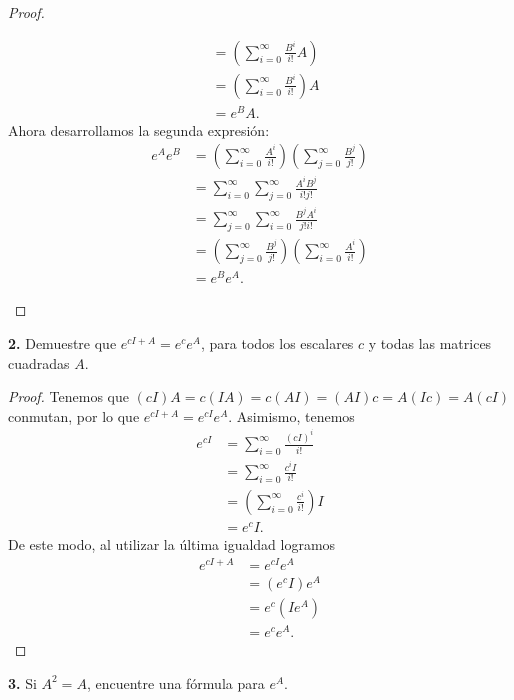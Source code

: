 \documentclass{article}
\newenvironment{statement}[1]{\smallskip\noindent\color[rgb]{1.00,0.00,0.50} {\bf #1.}}{}
\theoremstyle{definition}
\theoremstyle{remark}
\begin{document}
\begin{proof}
\begin{enumerate}
\begin{align*}
        &= \left(\sum_{i = 0}^{\infty} \frac{B^i}{i!} A\right)\\
        &= \left(\sum_{i = 0}^{\infty} \frac{B^i}{i!}\right) A\\
        &= e^B A.
      \end{align*}
      Ahora desarrollamos la segunda expresi\'on:
      \begin{align*}
        e^A e^B &= \left(\sum_{i = 0}^{\infty} \frac{A^i}{i!}\right)\left(\sum_{j = 0}^{\infty} \frac{B^j}{j!}\right)\\
        &= \sum_{i = 0}^{\infty} \sum_{j = 0}^{\infty} \frac{A^i B^j}{i! j!}\\
        &= \sum_{j = 0}^{\infty} \sum_{i = 0}^{\infty} \frac{B^j A^i}{j! i!}\\
        &= \left(\sum_{j = 0}^{\infty} \frac{B^j}{j!}\right)\left(\sum_{i = 0}^{\infty} \frac{A^i}{i!}\right)\\
        &= e^B e^A.
      \end{align*}
  \end{enumerate}
\end{proof}

\begin{statement}{2}
  Demuestre que $e^{c I  + A} = e^c e^A$, para todos los escalares $c$ y todas las matrices cuadradas $A$.
\end{statement}

\begin{proof}
  Tenemos que $(c I) A = c (I A) = c (A I) = (A I) c = A (I c) = A (c I)$ conmutan,
  por lo que $e^{c I + A} = e^{c I} e^A$. Asimismo, tenemos
  \begin{align*}
    e^{cI} &= \sum_{i = 0}^{\infty} \frac{(c I)^i}{i!}\\
    &= \sum_{i = 0}^{\infty} \frac{c^i I}{i!}\\
    &= \left(\sum_{i = 0}^{\infty} \frac{c^i}{i!}\right) I\\
    &= e^c I.
  \end{align*}
  De este modo, al utilizar la \'ultima igualdad logramos
  \begin{align*}
    e^{c I + A} &= e^{c I} e^A\\
    &= (e^c I) e^A\\
    &= e^c (I e^A)\\
    &= e^c e^A.
  \end{align*}
\end{proof}

\begin{statement}{3}
  Si $A^2 = A$, encuentre una f\'ormula para $e^A$.
\end{statement}
\end{document}

